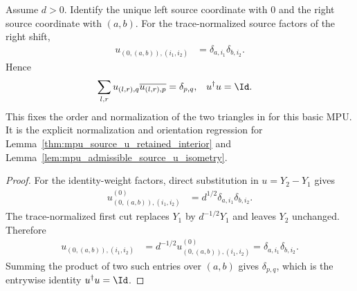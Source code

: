 \begin{lemma}
    \label{thm:mpu_right_shift_paper_source_u}
    \leanok
    Assume $d>0$. Identify the unique left source coordinate with $0$ and the
    right source coordinate with $(a,b)$. For the trace-normalized source
    factors of the right shift,
    \begin{align}
        u_{(0,(a,b)),(i_1,i_2)}
         & =\delta_{a,i_1}\delta_{b,i_2}.
    \end{align}
    Hence
    \begin{align}
        \sum_{l,r}u_{(l,r),q}\overline{u_{(l,r),p}}
         & =\delta_{p,q},
         & u^\dagger u    & =\Id.
    \end{align}
    This fixes the order and normalization of the two triangles in
    \cite[equations~\texttt{uu} and~\texttt{uUnitary}]{Cirac2017MPU} for this
    basic MPU. It is the explicit normalization and orientation regression for
    Lemma~\ref{thm:mpu_source_u_retained_interior} and
    Lemma~\ref{lem:mpu_admissible_source_u_isometry}.
\end{lemma}

\begin{proof}\leanok
    For the identity-weight factors, direct substitution in
    $u=Y_2\mathbin{-}Y_1$ gives
    \begin{align}
        u^{(0)}_{(0,(a,b)),(i_1,i_2)}
         & =d^{1/2}\delta_{a,i_1}\delta_{b,i_2}.
    \end{align}
    The trace-normalized first cut replaces $Y_1$ by $d^{-1/2}Y_1$ and leaves
    $Y_2$ unchanged. Therefore
    \begin{align}
        u_{(0,(a,b)),(i_1,i_2)}
         & =d^{-1/2}u^{(0)}_{(0,(a,b)),(i_1,i_2)}
        =\delta_{a,i_1}\delta_{b,i_2}.
    \end{align}
    Summing the product of two such entries over $(a,b)$ gives
    $\delta_{p,q}$, which is the entrywise identity $u^\dagger u=\Id$.
\end{proof}

